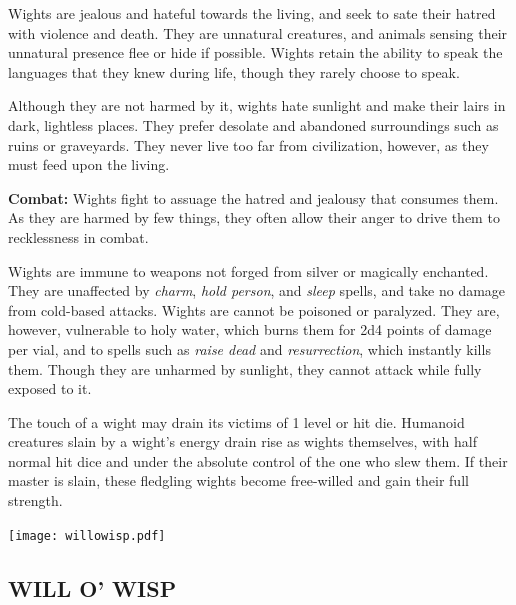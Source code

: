 \begin{multicols}{2}
Wights are jealous and hateful towards the living, and seek to sate their hatred with violence and death. They are unnatural creatures, and animals sensing their unnatural presence flee or hide if possible. Wights retain the ability to speak the languages that they knew during life, though they rarely choose to speak.

Although they are not harmed by it, wights hate sunlight and make their lairs in dark, lightless places. They prefer desolate and abandoned surroundings such as ruins or graveyards. They never live too far from civilization, however, as they must feed upon the living.

\textbf{Combat:} Wights fight to assuage the hatred and jealousy that consumes them. As they are harmed by few things, they often allow their anger to drive them to recklessness in combat.

Wights are immune to weapons not forged from silver or magically enchanted. They are unaffected by \textit{charm}, \textit{hold person}, and \textit{sleep} spells, and take no damage from cold-based attacks. Wights are cannot be poisoned or paralyzed. They are, however, vulnerable to holy water, which burns them for 2d4 points of damage per vial, and to spells such as \textit{raise dead} and \textit{resurrection}, which instantly kills them. Though they are unharmed by sunlight, they cannot attack while fully exposed to it.

The touch of a wight may drain its victims of 1 level or hit die. Humanoid creatures slain by a wight's energy drain rise as wights themselves, with half normal hit dice and under the absolute control of the one who slew them. If their master is slain, these fledgling wights become free-willed and gain their full strength.

\noindent\texttt{[image: willowisp.pdf]}\label{willowisp}

\noindent
\begin{minipage}{\columnwidth}

\vspace{1em}

\subsection{WILL O' WISP}


\end{minipage}
\end{multicols}
